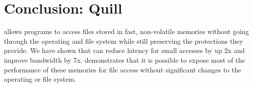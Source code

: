 \section{Conclusion: Quill}
\label{sec:conclude-quill}

\Muse{} allows programs to access files stored in fast, non-volatile memories
without going through the operating and file system while still preserving the
protections they provide.  We have shown that \Muse{} can reduce latency for
small accesses by up 2x and improve bandwidth by 7x.  \Muse{}
demonstrates that it is possible to expose most of the performance of these
memories for file access without significant changes to the operating or file
system.


